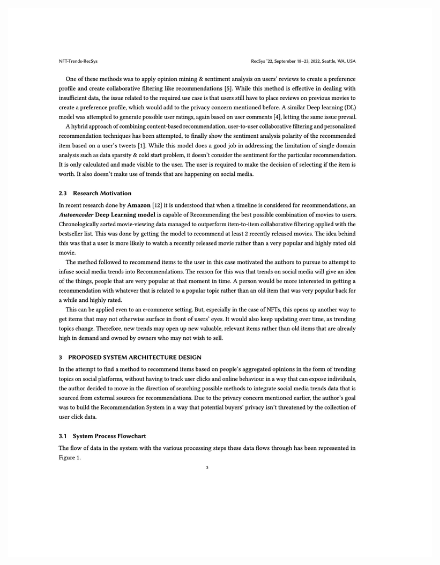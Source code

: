 \begin{figure}[h!]
\centering
\includegraphics[width=\textwidth]{images/appendix/papers/trends/Exploration of the possibility of infusing Social Media Trends into generating NFT Recommendations 3.jpeg}
\end{figure}

